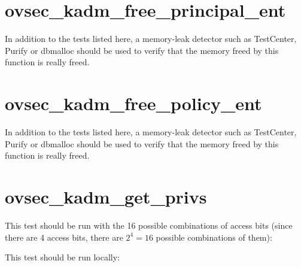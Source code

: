 



\section{ovsec_kadm_free_principal_ent}

In addition to the tests listed here, a memory-leak detector such as
TestCenter, Purify or dbmalloc should be used to verify that the
memory freed by this function is really freed.




\section{ovsec_kadm_free_policy_ent}

In addition to the tests listed here, a memory-leak detector such as
TestCenter, Purify or dbmalloc should be used to verify that the
memory freed by this function is really freed.





\section{ovsec_kadm_get_privs}


This test should be run with the 16 possible combinations of access
bits (since there are 4 access bits, there are $2^4 = 16$ possible
combinations of them):


This test should be run locally:



